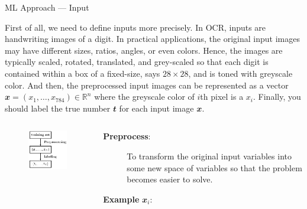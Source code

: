 \documentclass{bredelebeamer}
\begin{document}
\begin{frame}{ML Approach --- Input}
  \begin{justify}
    First of all, we need to define inputs more precisely. In OCR, inputs are
    handwriting images of a digit. In practical applications, the original input
    images may have different sizes, ratios, angles, or even colors. Hence, the
    images are typically scaled, rotated, translated, and grey-scaled so that
    each digit is contained within a box of a fixed-size, says $28 \times 28$,
    and is toned with greyscale color. And then, the preprocessed input images
    can be represented as a vector $\mathbfit{x}=(x_{1},\ldots,x_{784}) \in
    \mathbb{R}^n$ where the greyscale color of $i$th pixel is a $x_i$. Finally,
    you should label the true number $\mathbfit{t}$ for each input image
    $\mathbfit{x}$.
  \end{justify}
  \begin{columns}
    \begin{column}{0.1\textwidth}
      \begin{figure}[h]
      \centering
      \includegraphics[scale=0.5]{desc_input.pdf}
      \caption{ }
      \end{figure}
    \end{column}
      \begin{column}{0.8\textwidth}
        \begin{description}
          \item [\textbf{Preprocess}:]
            \begin{justify}
              To transform the original input variables into some new space
              of variables so that the problem becomes easier to solve.
            \end{justify}
          \item [\textbf{Example} $\mathbfit{x}_i$:]
            \begin{justify}

\end{justify}
\end{description}
\end{column}
\end{columns}
\end{frame}
\end{document}
